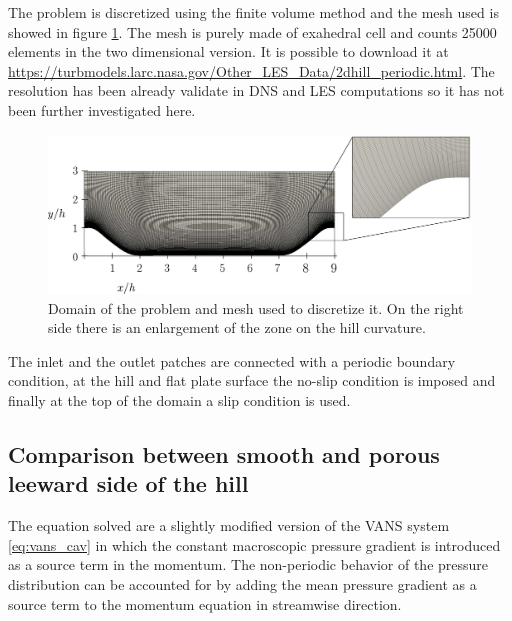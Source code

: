 The problem is discretized using the finite volume method and the mesh used is showed in figure \ref{fig:mesh_hill}. The mesh is purely made of exahedral cell and counts 25000 elements in the two dimensional version. It is possible to download it at \url{https://turbmodels.larc.nasa.gov/Other_LES_Data/2dhill_periodic.html}. The resolution has been already validate in DNS and LES computations so it has not been further investigated here.

\begin{figure}[h]
	\centering
	\includegraphics[width=1\linewidth]{chapter_5/figure/mesh}
	\caption{Domain of the problem and mesh used to discretize it. On the right side there is an enlargement of the zone on the hill curvature.}
	\label{fig:mesh_hill}
\end{figure}


The inlet and the outlet patches are connected with a periodic boundary condition, at the hill and flat plate surface the no-slip condition is imposed and finally at the top of the domain a slip condition is used.





\subsection{Comparison between smooth and porous leeward side of the hill}

The equation solved are a slightly modified version of the VANS system \eqref{eq:vans_cav} in which the constant macroscopic pressure gradient is introduced as a source term in the momentum.
The non-periodic behavior of the pressure distribution can be accounted for by adding the mean pressure gradient as a source term to the momentum equation in streamwise direction.

